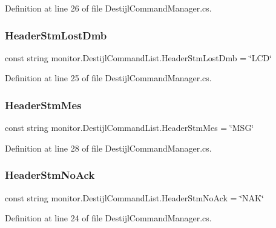 Definition at line 26 of file Destijl\+Command\+Manager.\+cs.

\mbox{\label{classmonitor_1_1_destijl_command_list_a54e9ebd5e8f34ac596b84b56bb2403f7}} 
\subsubsection{Header\+Stm\+Lost\+Dmb}
{\footnotesize\ttfamily const string monitor.\+Destijl\+Command\+List.\+Header\+Stm\+Lost\+Dmb = \char`\"{}L\+CD\char`\"{}}



Definition at line 25 of file Destijl\+Command\+Manager.\+cs.

\mbox{\label{classmonitor_1_1_destijl_command_list_ad1fa4557b2d44dd888d8640f374c9f04}} 
\subsubsection{Header\+Stm\+Mes}
{\footnotesize\ttfamily const string monitor.\+Destijl\+Command\+List.\+Header\+Stm\+Mes = \char`\"{}M\+SG\char`\"{}}



Definition at line 28 of file Destijl\+Command\+Manager.\+cs.

\mbox{\label{classmonitor_1_1_destijl_command_list_ae3dc86c7e90bba409317e63cf1c85a39}} 
\subsubsection{Header\+Stm\+No\+Ack}
{\footnotesize\ttfamily const string monitor.\+Destijl\+Command\+List.\+Header\+Stm\+No\+Ack = \char`\"{}N\+AK\char`\"{}}



Definition at line 24 of file Destijl\+Command\+Manager.\+cs.

